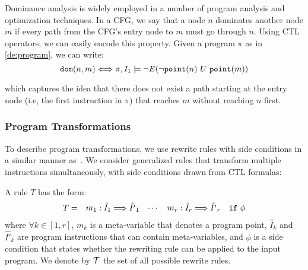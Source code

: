 

\begin{example}
Dominance analysis is widely employed in a number of program analysis and optimization techniques. In a CFG, we say that a node $n$ dominates another node $m$ if every path from the CFG's entry node to $m$ must go through $n$. Using CTL operators, we can easily encode this property. Given a program $\pi$ as in \mydefinition\ref{de:program}, we can write:
\begin{equation*}
 \text{${\tt dom}$}(n,m) \Longleftrightarrow \pi,I_1 \models \neg E(\neg\text{${\tt point}$}(n)~U~\text{${\tt point}$}(m))
\end{equation*}

\noindent which captures the idea that there does not exist a path starting at the entry node (i.e, the first instruction in $\pi$) that reaches $m$ without reaching $n$ first.
\end{example}

\subsubsection*{Program Transformations}

To describe program transformations, we use rewrite rules with side conditions in a similar manner as~\cite{Lacey04,Kundu09}. We consider generalized rules that transform multiple instructions simultaneously, with side conditions drawn from CTL formulas:

\begin{definition}
\label{de:rewrite-rule}
A rule $T$ has the form:
\vspace{-1mm}
\begin{equation*}
\begin{array}{lllll}
T = & m_1: \hat{I}_1 \Longrightarrow \hat{I'}_1 %
& \cdots
& m_r: \hat{I}_r \Longrightarrow \hat{I'}_r
& {\tt if} ~ \phi
\end{array}
\vspace{-1mm}
\end{equation*}
\noindent where $\forall k\in[1,r]$, $m_k$ is a meta-variable that denotes a program point, $\hat{I}_k$ and $\hat{I'}_k$ are program instructions that can contain meta-variables, and $\phi$ is a side condition that states whether the rewriting rule can be applied to the input program. We denote by $\mathcal{T}$ the set of all possible rewrite rules.
\end{definition}

